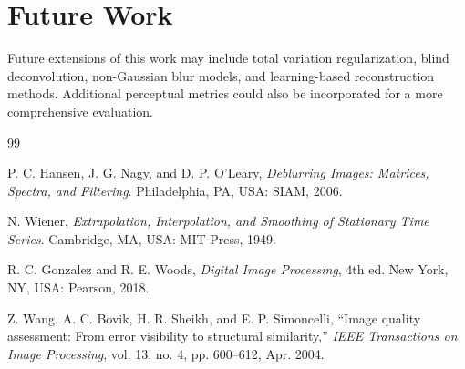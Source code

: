 \documentclass[conference]{IEEEtran}
\begin{document}
	\section*{Future Work}
	Future extensions of this work may include total variation regularization, blind deconvolution, non-Gaussian blur models, and learning-based reconstruction methods. Additional perceptual metrics could also be incorporated for a more comprehensive evaluation.
	
	\begin{thebibliography}{99}
		
		P. C. Hansen, J. G. Nagy, and D. P. O'Leary, \textit{Deblurring Images: Matrices, Spectra, and Filtering}. Philadelphia, PA, USA: SIAM, 2006.
		
		N. Wiener, \textit{Extrapolation, Interpolation, and Smoothing of Stationary Time Series}. Cambridge, MA, USA: MIT Press, 1949.
		
		R. C. Gonzalez and R. E. Woods, \textit{Digital Image Processing}, 4th ed. New York, NY, USA: Pearson, 2018.
		
		Z. Wang, A. C. Bovik, H. R. Sheikh, and E. P. Simoncelli, ``Image quality assessment: From error visibility to structural similarity,'' \textit{IEEE Transactions on Image Processing}, vol. 13, no. 4, pp. 600--612, Apr. 2004.
		
	\end{thebibliography}
	
\end{document}
